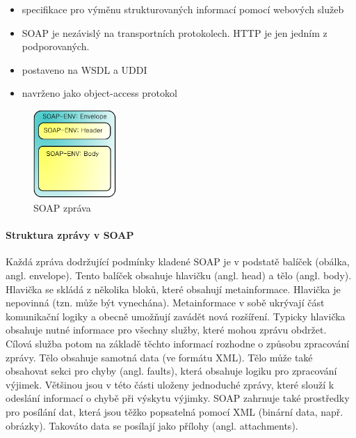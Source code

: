 \begin{itemize}[itemsep=0px]
\item specifikace pro výměnu strukturovaných informací pomocí webových služeb
\item SOAP je nezávislý na transportních protokolech. HTTP je jen jedním z podporovaných.
\item postaveno na WSDL a UDDI
\item navrženo jako object-access protokol
\end{itemize}

\begin{figure}
  \begin{center}
    \includegraphics[width=0.28\textwidth]{10/images/soap-message}
  \end{center}
  \vspace{-10px}
  \caption{SOAP zpráva}
\end{figure}

\paragraph{Struktura zprávy v SOAP}
Každá zpráva dodržující podmínky kladené SOAP je v podstatě balíček (obálka, angl. envelope). Tento balíček obsahuje hlavičku (angl. head) a tělo (angl. body). Hlavička se skládá z několika bloků, které obsahují metainformace. Hlavička je nepovinná (tzn. může být vynechána). Metainformace v sobě ukrývají část komunikační logiky a obecně umožňují zavádět nová rozšíření. Typicky hlavička obsahuje nutné informace pro všechny služby, které mohou zprávu obdržet. Cílová služba potom na základě těchto informací rozhodne o způsobu zpracování zprávy. Tělo obsahuje samotná data (ve formátu XML). Tělo může také obsahovat sekci pro
chyby (angl. faults), která obsahuje logiku pro zpracování výjimek. Většinou jsou v této části uloženy jednoduché zprávy, které slouží k odeslání informací o chybě při výskytu výjimky. SOAP zahrnuje také prostředky pro posílání dat, která jsou těžko popsatelná pomocí XML (binární data, např. obrázky). Takováto data se posílají jako přílohy (angl. attachments).

